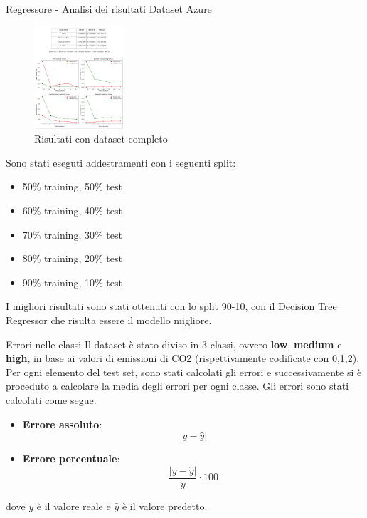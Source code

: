 \begin{frame}{Regressore - Analisi dei risultati Dataset Azure}
    \begin{figure}
    \centering
    \includegraphics[width=0.3\textwidth]{images/RisultatiRegAzure.png}
    \caption{Risultati con dataset completo}
\end{figure}
\small
Sono stati eseguti addestramenti con i seguenti split:
\begin{itemize}
    \item 50\% training, 50\% test
    \item 60\% training, 40\% test
    \item 70\% training, 30\% test
    \item 80\% training, 20\% test
    \item 90\% training, 10\% test
\end{itemize} 
I migliori risultati sono stati ottenuti con lo split 90-10, con il Decision Tree Regressor che risulta essere il modello migliore.
\end{frame}


\begin{frame}{Errori nelle classi}
Il dataset è stato diviso in 3 classi, ovvero \textbf{low}, \textbf{medium} e \textbf{high}, in base ai valori di emissioni di CO2 (rispettivamente codificate con 0,1,2).
Per ogni elemento del test set, sono stati calcolati gli errori e successivamente si è proceduto a calcolare la media degli errori per ogni classe.
Gli errori sono stati calcolati come segue:
\begin{itemize}
    \item \textbf{Errore assoluto}:\begin{equation*}
        |y - \hat{y}|
         \end{equation*}
    \item \textbf{Errore percentuale}: \begin{equation*}
        \frac{|y - \hat{y}|}{y} \cdot 100
    \end{equation*}
\end{itemize}
dove $y$ è il valore reale e $\hat{y}$ è il valore predetto.
\end{frame}

